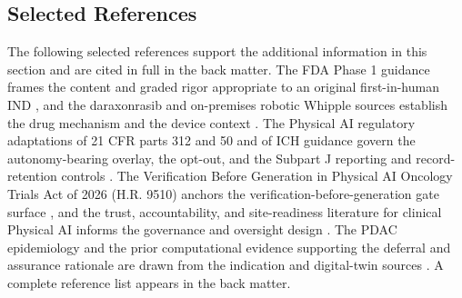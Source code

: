 \subsection{Selected References}

The following selected references support the additional information in this section
and are cited in full in the back matter. The FDA Phase 1 guidance frames the
content and graded rigor appropriate to an original first-in-human IND
\cite{phase1guidance}, and the daraxonrasib and on-premises robotic Whipple sources
establish the drug mechanism and the device context \cite{daraxwhipple,onpremwhippl}.
The Physical AI regulatory adaptations of 21 CFR parts 312 and 50 and of ICH
guidance govern the autonomy-bearing overlay, the opt-out, and the Subpart J
reporting and record-retention controls \cite{cfr312paiuni,cfr050paiuni,ichpaistduni}.
The Verification Before Generation in Physical AI Oncology Trials Act of 2026 (H.R.
9510) anchors the verification-before-generation gate surface \cite{congress9510},
and the trust, accountability, and site-readiness literature for clinical Physical AI
informs the governance and oversight design
\cite{clintrustpai,paiautospons,natlpaiplatf,paisitedocpk}. The PDAC epidemiology and
the prior computational evidence supporting the deferral and assurance rationale are
drawn from the indication and digital-twin sources
\cite{pdac060s2030,qspmetpancre,fdadigtwinpc,chatgpt100kp,pdacdigtwinp,llmcomp16fda,paipredict4x}.
A complete reference list appears in the back matter.
